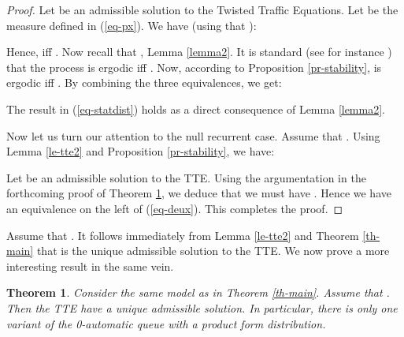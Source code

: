 \documentclass[11pt,a4paper]{article}
\newtheorem{theorem}{Theorem}[section]
\theoremstyle{remark}
\def\eref#1{(\ref{#1})}
\begin{document}
\begin{proof}
Let  be an admissible solution to the Twisted Traffic
Equations. Let  be the measure
defined in \eref{eq-px}.
We have (using that ):

Hence,  iff . Now recall that
, Lemma \ref{lemma2}.
It is standard (see for instance \cite[Chapter 8]{brem99})
that the process  is ergodic iff .
Now, according to Proposition \ref{pr-stability},
 is ergodic iff . By
combining the three equivalences, we get:

The result in \eref{eq-statdist} holds as a direct consequence of Lemma
\ref{lemma2}.

Now let us turn our attention to the null recurrent case. Assume that
.
Using Lemma \ref{le-tte2} and Proposition \ref{pr-stability}, we have:

Let  be an admissible  solution to the TTE. Using the
argumentation in the forthcoming proof of
Theorem \ref{th-uniq}, we deduce that we must have
. Hence we have an equivalence on
the left of \eref{eq-deux}. This completes the proof.
\end{proof}





Assume that .
It follows immediately from Lemma \ref{le-tte2} and Theorem \ref{th-main}
that  is the unique admissible solution to the
TTE. We now prove a more interesting result in the same vein.


\begin{theorem}\label{th-uniq}
Consider the same model as in Theorem \ref{th-main}. Assume that
. Then the TTE have a unique
admissible solution. In particular, there is only one variant of
the 0-automatic queue  with a product form
distribution.
\end{theorem}
\end{document}
